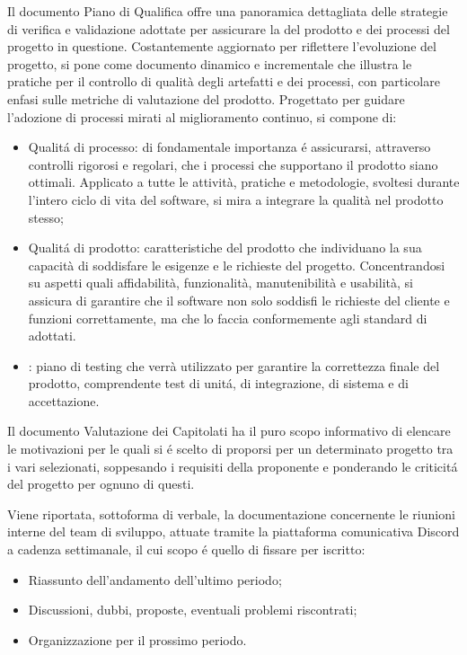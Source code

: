 Il documento Piano di Qualifica offre una panoramica dettagliata delle strategie di verifica e validazione adottate per assicurare la  del prodotto e dei processi del progetto in questione. Costantemente aggiornato per riflettere l'evoluzione del progetto, si pone come documento dinamico e incrementale che illustra le pratiche per il controllo di qualità degli artefatti e dei processi, con particolare enfasi sulle metriche di valutazione del prodotto. Progettato per guidare l'adozione di processi mirati al miglioramento continuo, si compone di:
\begin{itemize}
    \item Qualitá di processo: di fondamentale importanza é assicurarsi, attraverso controlli rigorosi e regolari, che i processi che supportano il prodotto siano ottimali. Applicato a tutte le attività, pratiche e metodologie, svoltesi durante l'intero ciclo di vita del software, si mira a integrare la qualità nel prodotto stesso;
    \item Qualitá di prodotto: caratteristiche del prodotto che individuano la sua capacità di soddisfare le esigenze e le richieste del progetto. Concentrandosi su aspetti quali affidabilità, funzionalità, manutenibilità e usabilità, si assicura di garantire che il software non solo soddisfi le richieste del cliente e funzioni correttamente, ma che lo faccia conformemente agli standard di  adottati.
    \item {}: piano di testing che verrà utilizzato per garantire la correttezza finale del prodotto, comprendente test di unitá, di integrazione, di sistema e di accettazione.
\end{itemize} 

Il documento Valutazione dei Capitolati ha il puro scopo informativo di elencare le motivazioni per le quali si é scelto di proporsi per un determinato progetto tra i vari selezionati, soppesando i requisiti della proponente e ponderando le criticitá del progetto per ognuno di questi.  

Viene riportata, sottoforma di verbale, la documentazione concernente le riunioni interne del team di sviluppo, attuate tramite la piattaforma comunicativa Discord a cadenza settimanale, il cui scopo é quello di fissare per iscritto:
\begin{itemize}
    \item Riassunto dell'andamento dell'ultimo periodo;
    \item Discussioni, dubbi, proposte, eventuali problemi riscontrati;
    \item Organizzazione per il prossimo periodo.
\end{itemize}

